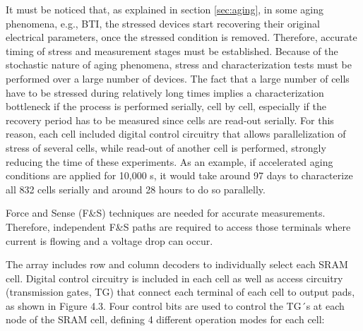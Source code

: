 It must be noticed that, as explained in section \ref{sec:aging}, in some aging phenomena, e.g., BTI, the stressed devices start recovering their original electrical parameters, once the stressed condition is removed. Therefore, accurate timing of stress and measurement stages must be established. Because of the stochastic nature of aging phenomena, stress and characterization tests must be performed over a large number of devices. The fact that a large number of cells have to be stressed during relatively long times implies a characterization bottleneck if the process is performed serially, cell by cell, especially if the recovery period has to be measured since cells are read-out serially. For this reason, each cell included digital control circuitry that allows parallelization of stress of several cells, while read-out of another cell is performed, strongly reducing the time of these experiments. As an example, if accelerated aging conditions are applied for 10,000 s, it would take around 97 days to characterize all 832 cells serially and around 28 hours to do so parallelly.

Force and Sense (F\&S) techniques are needed for accurate measurements. Therefore, independent F\&S paths are required to access those terminals where current is flowing and a voltage drop can occur.
 
The array includes row and column decoders to individually select each SRAM cell. Digital control circuitry is included in each cell as well as access circuitry (transmission gates, TG) that connect each terminal of each cell to output pads, as shown in Figure 4.3. Four control bits are used to control the TG´s at each node of the SRAM cell, defining 4 different operation modes for each cell: 

